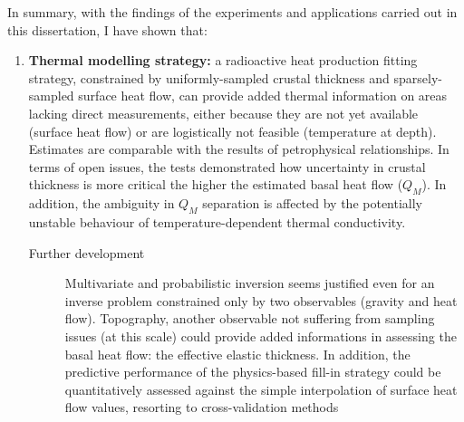 In summary, with the findings of the experiments and applications carried out in this dissertation, I have shown that:
\begin{enumerate}
    \item \textsf{\textbf{Thermal modelling strategy:}}
    a radioactive heat production fitting strategy, constrained by uniformly-sampled crustal thickness and sparsely-sampled surface heat flow, can provide added thermal information on areas lacking direct measurements, either because they are not yet available (surface heat flow) or are logistically not feasible (temperature at depth).
    Estimates are comparable with the results of petrophysical relationships.
    In terms of open issues, the tests demonstrated how uncertainty in crustal thickness is more critical the higher the estimated basal heat flow ($Q_{M}$). In addition, the ambiguity in $Q_{M}$ separation is affected by the potentially unstable behaviour of temperature-dependent thermal conductivity.
    \begin{description}
        \item[\quad Further development] Multivariate and probabilistic inversion seems justified even for an inverse problem constrained only by two observables (gravity and heat flow). Topography, another observable not suffering from sampling issues (at this scale) could provide added informations in assessing the basal heat flow: the effective elastic thickness.
        In addition, the predictive performance of the physics-based fill-in strategy could be quantitatively assessed against the simple interpolation of surface heat flow values, resorting to cross-validation methods \parencite[e.g.][, chapter~1]{Bishop2006ML}
    \end{description}


\end{enumerate}
